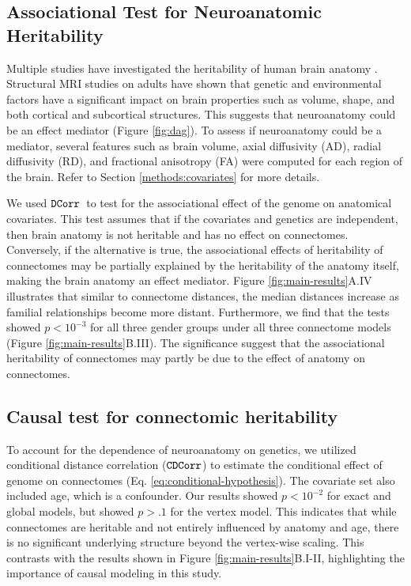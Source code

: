 \subsection{Associational Test for Neuroanatomic Heritability} \label{sec:neuroanatomy-dcorr}
Multiple studies have investigated the heritability of human brain anatomy \cite{blokland2012genetic, ge2016multidimensional, brouwer2014heritability, thompson2001genetic, lee2016partitioning, den2013heritability}. 
Structural MRI studies on adults have shown that genetic and environmental factors have a significant impact on brain properties such as volume, shape, and both cortical and subcortical structures.  This suggests that neuroanatomy could be an effect mediator (Figure \ref{fig:dag}).
 To assess if neuroanatomy could be a mediator, several features such as brain volume, axial diffusivity (AD), radial diffusivity (RD), and fractional anisotropy (FA) were computed for each region of the brain. Refer to Section \ref{methods:covariates} for more details. 

We used $\operatorname{\mathtt{DCorr}}$~to test for the associational effect of the genome on anatomical covariates. This test assumes that if the covariates and genetics are independent, then brain anatomy is not heritable and has no effect on connectomes. Conversely, if the alternative is true, the associational effects of heritability of connectomes may be partially explained by the heritability of the anatomy itself, making the brain anatomy an effect mediator. Figure \ref{fig:main-results}A.IV illustrates that similar to connectome distances, the median distances increase as familial relationships become more distant. Furthermore, we find that the tests showed $p<10^{-3}$ for all three gender groups under all three connectome models (Figure \ref{fig:main-results}B.III). The significance suggest that the associational heritability of connectomes may partly be due to the effect of anatomy on connectomes. 

\subsection{Causal test for connectomic heritability}
\label{sec:conditional_dcorr}
To account for the dependence of neuroanatomy on genetics, we utilized conditional distance correlation ($\operatorname{\mathtt{CDCorr}}$) to estimate the conditional effect of genome on connectomes (Eq. \ref{eq:conditional-hypothesis}). The covariate set also included age, which is a confounder. 
Our results showed $p<10^{-2}$ for exact and global models, but showed $p>.1$ for the vertex model. This indicates that while connectomes are heritable and not entirely influenced by anatomy and age, there is no significant underlying structure beyond the vertex-wise scaling. This contrasts with the results shown in Figure \ref{fig:main-results}B.I-II, highlighting the importance of causal modeling in this study.

